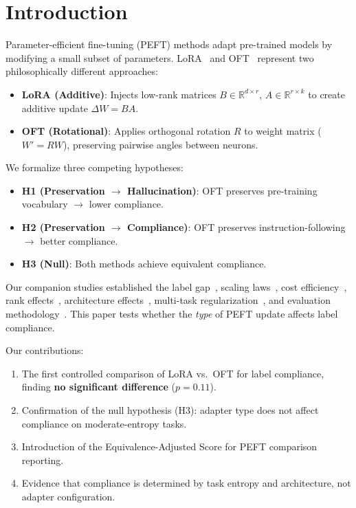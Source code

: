 \documentclass[review,3p]{elsarticle}
\begin{document}
\section{Introduction}
Parameter-efficient fine-tuning (PEFT) methods adapt pre-trained models by modifying a small subset of parameters. LoRA~\cite{hu2022} and OFT~\cite{qiu2023} represent two philosophically different approaches:

\begin{itemize}
\item \textbf{LoRA (Additive)}: Injects low-rank matrices $B \in \mathbb{R}^{d \times r}$, $A \in \mathbb{R}^{r \times k}$ to create additive update $\Delta W = BA$.
\item \textbf{OFT (Rotational)}: Applies orthogonal rotation $R$ to weight matrix ($W' = RW$), preserving pairwise angles between neurons.
\end{itemize}

We formalize three competing hypotheses:
\begin{itemize}
\item \textbf{H1 (Preservation $\to$ Hallucination)}: OFT preserves pre-training vocabulary $\to$ lower compliance.
\item \textbf{H2 (Preservation $\to$ Compliance)}: OFT preserves instruction-following $\to$ better compliance.
\item \textbf{H3 (Null)}: Both methods achieve equivalent compliance.
\end{itemize}

Our companion studies established the label gap~\cite{p3}, scaling laws~\cite{p6}, cost efficiency~\cite{p7}, rank effects~\cite{p22}, architecture effects~\cite{p21}, multi-task regularization~\cite{p15}, and evaluation methodology~\cite{p19}. This paper tests whether the \emph{type} of PEFT update affects label compliance.

Our contributions:
\begin{enumerate}
\item The first controlled comparison of LoRA vs.\ OFT for label compliance, finding \textbf{no significant difference} ($p = 0.11$).
\item Confirmation of the null hypothesis (H3): adapter type does not affect compliance on moderate-entropy tasks.
\item Introduction of the Equivalence-Adjusted Score for PEFT comparison reporting.
\item Evidence that compliance is determined by task entropy and architecture, not adapter configuration.
\end{enumerate}
\end{document}
